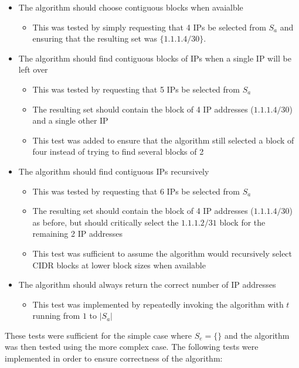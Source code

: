 \begin{itemize}
\item{The algorithm should choose contiguous blocks when avaialble}
      \begin{itemize}
      \item{This was tested by simply requesting that 4 IPs be selected from $S_a$ and ensuring that the resulting set was $\{1.1.1.4/30\}$.}
      \end{itemize}
\item{The algorithm should find contiguous blocks of IPs when a single IP will be left over}
      \begin{itemize}
      \item{This was tested by requesting that 5 IPs be selected from $S_a$}
      \item{The resulting set should contain the block of 4 IP addresses ($1.1.1.4/30$) and a single other IP}
      \item{This test was added to ensure that the algorithm still selected a block of four instead of trying to find several blocks of 2}
      \end{itemize}
\item{The algorithm should find contiguous IPs recursively}
      \begin{itemize}
      \item{This was tested by requesting that 6 IPs be selected from $S_a$}
      \item{The resulting set should contain the block of 4 IP addresses ($1.1.1.4/30$) as before, but should critically select the $1.1.1.2/31$ block for the remaining 2 IP addresses}
      \item{This test was sufficient to assume the algorithm would recursively select CIDR blocks at lower block sizes when available}
      \end{itemize}
\item{The algorithm should always return the correct number of IP addresses}
      \begin{itemize}
      \item{This test was implemented by repeatedly invoking the algorithm with $t$ running from $1$ to $|S_a|$}
      \end{itemize}
\end{itemize}

These tests were sufficient for the simple case where $S_e = \{\}$ and the algorithm was then tested using the more complex case. The following tests were implemented in order to ensure correctness of the algorithm:

